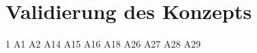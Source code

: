\chapter{Validierung des Konzepts}\label{cha:ValidierungDesKonzepts}
1 \cite{1}
 \cite{2}
 \cite{3}
 \cite{6}
 \cite{7}
 \cite{8}
 \cite{9}
 \cite{10}
 \cite{11}
 \cite{12}
 \cite{13}
 \cite{14}
 \cite{15}
 \cite{16}
 \cite{17}
 \cite{19}
 \cite{20}
 \cite{21}
 \cite{22}
 \cite{23}
 \cite{24}
 \cite{25}
 \cite{26}
 \cite{27}
 \cite{28}
 \cite{29}
 \cite{30}
 \cite{31}
 \cite{32}
\newline
A1 \cite{A1}
\newline
A2 \cite{A2}
\newline
A14 \cite{A14}
\newline
A15 \cite{A15}
\newline
A16 \cite{A16}
\newline
A18 \cite{A18}
\newline
A26 \cite{A26}
\newline
A27 \cite{A27}
\newline
A28 \cite{A28}
\newline
A29 \cite{A29}
\newline
